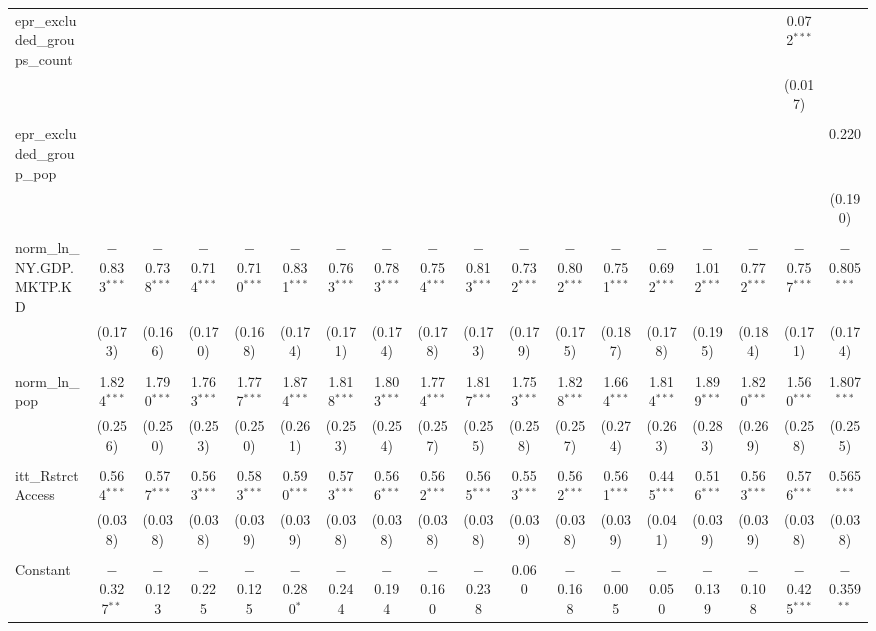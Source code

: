\begin{table}[!htbp]
\begin{tabular}{@{\extracolsep{5pt}}lccccccccccccccccc}
 epr\_excluded\_groups\_count &  &  &  &  &  &  &  &  &  &  &  &  &  &  &  & 0.072$^{***}$ &  \\ 
  &  &  &  &  &  &  &  &  &  &  &  &  &  &  &  & (0.017) &  \\ 
  & & & & & & & & & & & & & & & & & \\ 
 epr\_excluded\_group\_pop &  &  &  &  &  &  &  &  &  &  &  &  &  &  &  &  & 0.220 \\ 
  &  &  &  &  &  &  &  &  &  &  &  &  &  &  &  &  & (0.190) \\ 
  & & & & & & & & & & & & & & & & & \\ 
 norm\_ln\_NY.GDP.MKTP.KD & $-$0.833$^{***}$ & $-$0.738$^{***}$ & $-$0.714$^{***}$ & $-$0.710$^{***}$ & $-$0.831$^{***}$ & $-$0.763$^{***}$ & $-$0.783$^{***}$ & $-$0.754$^{***}$ & $-$0.813$^{***}$ & $-$0.732$^{***}$ & $-$0.802$^{***}$ & $-$0.751$^{***}$ & $-$0.692$^{***}$ & $-$1.012$^{***}$ & $-$0.772$^{***}$ & $-$0.757$^{***}$ & $-$0.805$^{***}$ \\ 
  & (0.173) & (0.166) & (0.170) & (0.168) & (0.174) & (0.171) & (0.174) & (0.178) & (0.173) & (0.179) & (0.175) & (0.187) & (0.178) & (0.195) & (0.184) & (0.171) & (0.174) \\ 
  & & & & & & & & & & & & & & & & & \\ 
 norm\_ln\_pop & 1.824$^{***}$ & 1.790$^{***}$ & 1.763$^{***}$ & 1.777$^{***}$ & 1.874$^{***}$ & 1.818$^{***}$ & 1.803$^{***}$ & 1.774$^{***}$ & 1.817$^{***}$ & 1.753$^{***}$ & 1.828$^{***}$ & 1.664$^{***}$ & 1.814$^{***}$ & 1.899$^{***}$ & 1.820$^{***}$ & 1.560$^{***}$ & 1.807$^{***}$ \\ 
  & (0.256) & (0.250) & (0.253) & (0.250) & (0.261) & (0.253) & (0.254) & (0.257) & (0.255) & (0.258) & (0.257) & (0.274) & (0.263) & (0.283) & (0.269) & (0.258) & (0.255) \\ 
  & & & & & & & & & & & & & & & & & \\ 
 itt\_RstrctAccess & 0.564$^{***}$ & 0.577$^{***}$ & 0.563$^{***}$ & 0.583$^{***}$ & 0.590$^{***}$ & 0.573$^{***}$ & 0.566$^{***}$ & 0.562$^{***}$ & 0.565$^{***}$ & 0.553$^{***}$ & 0.562$^{***}$ & 0.561$^{***}$ & 0.445$^{***}$ & 0.516$^{***}$ & 0.563$^{***}$ & 0.576$^{***}$ & 0.565$^{***}$ \\ 
  & (0.038) & (0.038) & (0.038) & (0.039) & (0.039) & (0.038) & (0.038) & (0.038) & (0.038) & (0.039) & (0.038) & (0.039) & (0.041) & (0.039) & (0.039) & (0.038) & (0.038) \\ 
  & & & & & & & & & & & & & & & & & \\ 
 Constant & $-$0.327$^{**}$ & $-$0.123 & $-$0.225 & $-$0.125 & $-$0.280$^{*}$ & $-$0.244 & $-$0.194 & $-$0.160 & $-$0.238 & 0.060 & $-$0.168 & $-$0.005 & $-$0.050 & $-$0.139 & $-$0.108 & $-$0.425$^{***}$ & $-$0.359$^{**}$ \\ 

\end{tabular}
\end{table}
